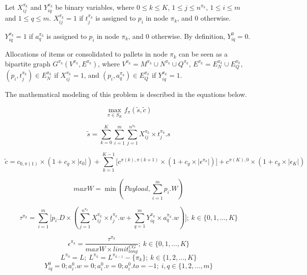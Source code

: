 \documentclass[preprint,authoryear]{elsarticle}
\begin{document}
Let $X_{ij}^{\pi_k}$ and $Y_{iq}^{\pi_k}$ be binary variables, where $0 \leq k \leq K$, $1 \leq j \leq n^{\pi_k}$, $1 \leq i \leq m$ and $1 \leq q \leq m$. $X_{ij}^{\pi_k} = 1$ if $t_j^{\pi_k}$ is assigned to $p_i$ in node $\pi_k$, and 0 otherwise.

$Y_{iq}^{\pi_k} = 1$ if $a_q^{\pi_k}$ is assigned to $p_i$ in node $\pi_k$, and 0 otherwise. By definition, $Y_{iq}^0=0$.

Allocations of items or consolidated to pallets in node $\pi_k$ can be seen as a bipartite graph $G^{\pi_k}(V^{\pi_k}, E^{\pi_k})$,
where $V^{\pi_k} = M^{\pi_k} \cup N^{\pi_k} \cup Q^{\pi_k}$, $E^{\pi_k} = E_N^{\pi_k} \cup E_Q^{\pi_k}$,
$(p_i, t_j^{\pi_k}) \in E_N^{\pi_k}$
if $X_{ij}^{\pi_k} = 1$, and $(p_i, a_q^{\pi_k}) \in E_Q^{\pi_k}$ if $Y_{iq}^{\pi_k} = 1$.

The mathematical modeling of this problem is described in the equations below.


\begin{equation} \label{eq:maxf}
	\max_{\pi \in S_K} f_\pi(\tilde{s},\tilde{c})
\end{equation}

\begin{equation} \label{eq:scores}
	\tilde{s} = \sum_{k=0}^{K} \sum_{i=1}^{m} \sum_{j=1}^{n^{\pi_k}} X_{ij}^{\pi_k} \times t_j^{\pi_k}.s
\end{equation}

\begin{equation} \label{eq:costs}
	\tilde{c} = c_{0,\pi(1)}\times(1+c_g\times|\epsilon_0|) + \sum_{k=1}^{K-1} \Big [ c^{\pi(k), \pi(k+1)}\times(1+c_g\times|\epsilon^{\pi_k}|) \Big ] + c^{\pi(K),0}\times(1+c_g\times|\epsilon_K|)
\end{equation}

\begin{equation} \label{eq:maxW}
	maxW = \min(Payload, \sum_{i=1}^{m}p_i.W)
\end{equation}

\begin{equation} \label{eq:tau}
\tau^{\pi_k} = \sum_{i=1}^{m} \Big [ p_i.D \times (\sum_{j=1}^{n^{\pi_k}} X_{ij}^{\pi_k} \times t_j^{\pi_k}.w +  \sum_{q=1}^{m} Y_{iq}^{\pi_k} \times a_q^{\pi_k}.w) \Big ];\ k \in \{0, 1, \ldots, K\}
\end{equation}

\begin{equation} \label{eq:eps}
\epsilon^{\pi_k} = \frac{\tau^{\pi_k}}{maxW \times limit^{CG}_{long}};\ k \in \{0, 1, \ldots, K\}
\end{equation}
{\color{blue}
\begin{equation} \label{eq:pdp11}
	L^{\pi_0} = L;\ L^{\pi_k} = L^{\pi_{k-1}} - \{\pi_k\}; \ k \in \{1, 2, \ldots, K\}
\end{equation}
}
\begin{equation} \label{eq:pdp13}
	Y^0_{iq} = 0; a^0_i.w = 0; a^0_i.v = 0; a^0_i.to = -1;\ i,q \in \{1, 2, \ldots, m\}
\end{equation}
\end{document}
